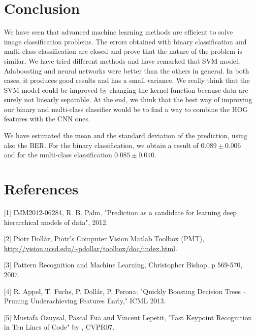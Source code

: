 \documentclass{article} %
\begin{document}
\section{Conclusion}

We have seen that advanced machine learning methods are efficient to solve image classification problems. The errors obtained with binary classification and multi-class classification are closed and prove that the nature of the problem is similar. We have tried different methods and have remarked that SVM model, Adaboosting and neural networks were better than the others in general. In both cases, it produces good results and has a small variance. We really think that the SVM model could be improved by changing the kernel function because data are surely not linearly separable. At the end, we think that the best way of improving our binary and multi-class classifier would be to find a way to combine the HOG features with the CNN ones. 

We have estimated the mean and the standard deviation of the prediction, using also the BER. For the binary classification, we obtain a result of $0.089 \pm 0.006$ and for the multi-class classification $0.085 \pm 0.010$.

\section{References}

[1]    IMM2012-06284, R. B. Palm, "Prediction as a candidate for learning deep hierarchical models of data", 2012.


[2]    Piotr Doll\'ar, {P}iotr's {C}omputer {V}ision {M}atlab {T}oolbox ({PMT}), \url{http://vision.ucsd.edu/~pdollar/toolbox/doc/index.html}. 


[3]    Pattern Recognition and Machine Learning, Christopher Bishop, p 569-570, 2007.


[4]    R. Appel, T. Fuchs, P. Dollár, P. Perona; "Quickly Boosting Decision Trees – Pruning Underachieving Features Early," ICML 2013.


[5]   Mustafa Ozuysal, Pascal Fua and Vincent Lepetit, "Fast Keypoint Recognition in Ten Lines of Code" by , CVPR07.
\end{document}
